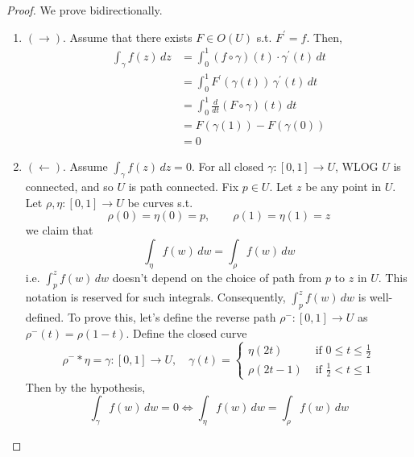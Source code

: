	\begin{proof}
	  We prove bidirectionally. 
		\begin{enumerate}
		  \item $(\rightarrow)$. Assume that there exists $F \in O(U)$ s.t. $F^\prime = f$. Then, 
				\begin{align}
					\int_\gamma f(z) \,dz & = \int_0^1 (f \circ \gamma)(t) \cdot \gamma^\prime (t) \,dt \\ 
																& = \int_0^1 F^\prime (\gamma(t)) \, \gamma^\prime (t) \,dt \tag{substitute} \\  
																& = \int_0^1 \frac{d}{dt} (F \circ \gamma) (t) \,dt \tag{chain rule}\\ 
																& = F(\gamma(1)) - F(\gamma(0)) \tag{fund. thm of calc} \\ 
																& = 0  \tag{closed}
				\end{align}
			\item $(\leftarrow)$. Assume $\int_\gamma f(z) \,dz = 0$. For all closed $\gamma: [0, 1] \to U$, WLOG $U$ is connected, and so $U$ is path connected. Fix $p \in U$. Let $z$ be any point in $U$. Let $\rho, \eta: [0, 1] \to U$ be curves s.t. 
				\begin{equation}
				  \rho(0) = \eta(0) = p, \qquad \rho(1) = \eta(1) = z
				\end{equation}
				we claim that 
				\begin{equation}
				  \int_\eta f(w) \,dw = \int_\rho f(w) \,dw
				\end{equation}
				i.e. $\int_p^z f(w) \,dw$ doesn't depend on the choice of path from $p$ to $z$ in $U$. This notation is reserved for such integrals. Consequently, $\int_p^z f(w) \,dw$ is well-defined. To prove this, let's define the reverse path $\rho^- : [0, 1] \to U$ as $\rho^{-}(t) = \rho(1 - t)$. Define the closed curve 
				\begin{equation}
					\rho^- \ast \eta = \gamma: [0, 1] \to U, \quad \gamma(t) = \begin{cases} \eta(2t) & \text{ if } 0 \leq t \leq \frac{1}{2} \\ \rho(2t - 1) & \text{ if } \frac{1}{2} < t \leq 1 \end{cases}
				\end{equation}
				Then by the hypothesis, 
				\begin{equation}
				  \int_\gamma f(w) \,dw = 0 \iff \int_\eta f(w)\,dw = \int_\rho f(w) \,dw 
				\end{equation}


\end{enumerate}
\end{proof}
